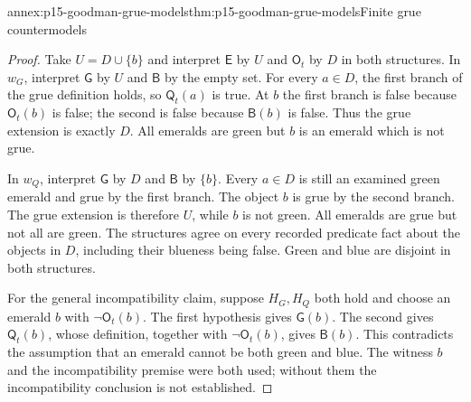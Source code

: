 \begin{annexitem}{annex:p15-goodman-grue-models}{thm:p15-goodman-grue-models}{Finite grue countermodels}
\begin{proof}
Take $U=D\cup\{b\}$ and interpret $\mathsf{E}$ by $U$ and
$\mathsf{O}_t$ by $D$ in both structures. In $w_G$, interpret
$\mathsf{G}$ by $U$ and $\mathsf{B}$ by the empty set. For every
$a\in D$, the first branch of the grue definition holds, so
$\mathsf{Q}_t(a)$ is true. At $b$ the first branch is false because
$\mathsf{O}_t(b)$ is false; the second is false because
$\mathsf{B}(b)$ is false. Thus the grue extension is exactly $D$.
All emeralds are green but $b$ is an emerald which is not grue.

In $w_Q$, interpret $\mathsf{G}$ by $D$ and $\mathsf{B}$ by
$\{b\}$. Every $a\in D$ is still an examined green emerald and
grue by the first branch. The object $b$ is grue by the second branch.
The grue extension is therefore $U$, while $b$ is not green. All
emeralds are grue but not all are green. The structures agree on every
recorded predicate fact about the objects in $D$, including their
blueness being false. Green and blue are disjoint in both structures.

For the general incompatibility claim, suppose $H_G,H_Q$ both hold
and choose an emerald $b$ with $\neg\mathsf{O}_t(b)$. The first
hypothesis gives $\mathsf{G}(b)$. The second gives
$\mathsf{Q}_t(b)$, whose definition, together with
$\neg\mathsf{O}_t(b)$, gives $\mathsf{B}(b)$. This contradicts the
assumption that an emerald cannot be both green and blue. The witness
$b$ and the incompatibility premise were both used; without them
the incompatibility conclusion is not established.
\end{proof}
\end{annexitem}

